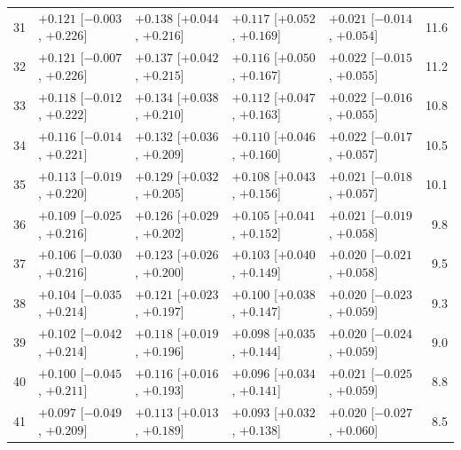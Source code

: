\begin{longtable}{rllllr}
31 & $+0.121$ {\scriptsize [$-0.003$, $+0.226$]} & $+0.138$ {\scriptsize [$+0.044$, $+0.216$]} & $+0.117$ {\scriptsize [$+0.052$, $+0.169$]} & $+0.021$ {\scriptsize [$-0.014$, $+0.054$]} & 11.6 \\
32 & $+0.121$ {\scriptsize [$-0.007$, $+0.226$]} & $+0.137$ {\scriptsize [$+0.042$, $+0.215$]} & $+0.116$ {\scriptsize [$+0.050$, $+0.167$]} & $+0.022$ {\scriptsize [$-0.015$, $+0.055$]} & 11.2 \\
33 & $+0.118$ {\scriptsize [$-0.012$, $+0.222$]} & $+0.134$ {\scriptsize [$+0.038$, $+0.210$]} & $+0.112$ {\scriptsize [$+0.047$, $+0.163$]} & $+0.022$ {\scriptsize [$-0.016$, $+0.055$]} & 10.8 \\
34 & $+0.116$ {\scriptsize [$-0.014$, $+0.221$]} & $+0.132$ {\scriptsize [$+0.036$, $+0.209$]} & $+0.110$ {\scriptsize [$+0.046$, $+0.160$]} & $+0.022$ {\scriptsize [$-0.017$, $+0.057$]} & 10.5 \\
35 & $+0.113$ {\scriptsize [$-0.019$, $+0.220$]} & $+0.129$ {\scriptsize [$+0.032$, $+0.205$]} & $+0.108$ {\scriptsize [$+0.043$, $+0.156$]} & $+0.021$ {\scriptsize [$-0.018$, $+0.057$]} & 10.1 \\
36 & $+0.109$ {\scriptsize [$-0.025$, $+0.216$]} & $+0.126$ {\scriptsize [$+0.029$, $+0.202$]} & $+0.105$ {\scriptsize [$+0.041$, $+0.152$]} & $+0.021$ {\scriptsize [$-0.019$, $+0.058$]} & 9.8 \\
37 & $+0.106$ {\scriptsize [$-0.030$, $+0.216$]} & $+0.123$ {\scriptsize [$+0.026$, $+0.200$]} & $+0.103$ {\scriptsize [$+0.040$, $+0.149$]} & $+0.020$ {\scriptsize [$-0.021$, $+0.058$]} & 9.5 \\
38 & $+0.104$ {\scriptsize [$-0.035$, $+0.214$]} & $+0.121$ {\scriptsize [$+0.023$, $+0.197$]} & $+0.100$ {\scriptsize [$+0.038$, $+0.147$]} & $+0.020$ {\scriptsize [$-0.023$, $+0.059$]} & 9.3 \\
39 & $+0.102$ {\scriptsize [$-0.042$, $+0.214$]} & $+0.118$ {\scriptsize [$+0.019$, $+0.196$]} & $+0.098$ {\scriptsize [$+0.035$, $+0.144$]} & $+0.020$ {\scriptsize [$-0.024$, $+0.059$]} & 9.0 \\
40 & $+0.100$ {\scriptsize [$-0.045$, $+0.211$]} & $+0.116$ {\scriptsize [$+0.016$, $+0.193$]} & $+0.096$ {\scriptsize [$+0.034$, $+0.141$]} & $+0.021$ {\scriptsize [$-0.025$, $+0.059$]} & 8.8 \\
41 & $+0.097$ {\scriptsize [$-0.049$, $+0.209$]} & $+0.113$ {\scriptsize [$+0.013$, $+0.189$]} & $+0.093$ {\scriptsize [$+0.032$, $+0.138$]} & $+0.020$ {\scriptsize [$-0.027$, $+0.060$]} & 8.5 \\

\end{longtable}

